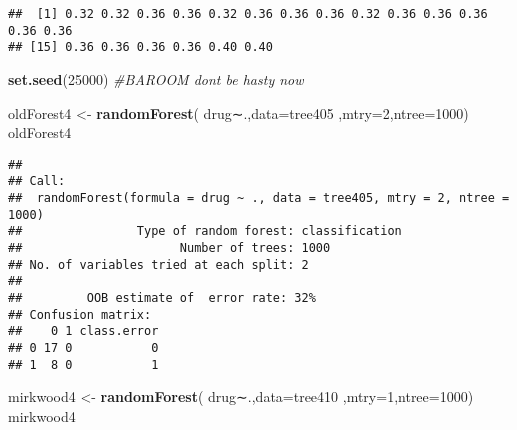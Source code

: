 \documentclass[]{article}
\newenvironment{Shaded}{\begin{snugshade}}{\end{snugshade}}
\newcommand{\KeywordTok}[1]{\textcolor[rgb]{0.13,0.29,0.53}{\textbf{#1}}}
\newcommand{\DataTypeTok}[1]{\textcolor[rgb]{0.13,0.29,0.53}{#1}}
\newcommand{\DecValTok}[1]{\textcolor[rgb]{0.00,0.00,0.81}{#1}}
\newcommand{\StringTok}[1]{\textcolor[rgb]{0.31,0.60,0.02}{#1}}
\newcommand{\CommentTok}[1]{\textcolor[rgb]{0.56,0.35,0.01}{\textit{#1}}}
\newcommand{\ControlFlowTok}[1]{\textcolor[rgb]{0.13,0.29,0.53}{\textbf{#1}}}
\newcommand{\OperatorTok}[1]{\textcolor[rgb]{0.81,0.36,0.00}{\textbf{#1}}}
\newcommand{\NormalTok}[1]{#1}
\begin{document}
\begin{Shaded}
\end{Shaded}

\begin{verbatim}
##  [1] 0.32 0.32 0.36 0.36 0.32 0.36 0.36 0.36 0.32 0.36 0.36 0.36 0.36 0.36
## [15] 0.36 0.36 0.36 0.36 0.40 0.40
\end{verbatim}

\begin{Shaded}
\begin{Highlighting}[]
\KeywordTok{set.seed}\NormalTok{(}\DecValTok{25000}\NormalTok{)}
\CommentTok{#BAROOM dont be hasty now}

\NormalTok{oldForest4 <-}\StringTok{ }\KeywordTok{randomForest}\NormalTok{( drug∼.,}\DataTypeTok{data=}\NormalTok{tree405  ,}\DataTypeTok{mtry=}\DecValTok{2}\NormalTok{,}\DataTypeTok{ntree=}\DecValTok{1000}\NormalTok{)}
\NormalTok{oldForest4}
\end{Highlighting}
\end{Shaded}

\begin{verbatim}
## 
## Call:
##  randomForest(formula = drug ~ ., data = tree405, mtry = 2, ntree = 1000) 
##                Type of random forest: classification
##                      Number of trees: 1000
## No. of variables tried at each split: 2
## 
##         OOB estimate of  error rate: 32%
## Confusion matrix:
##    0 1 class.error
## 0 17 0           0
## 1  8 0           1
\end{verbatim}

\begin{Shaded}
\begin{Highlighting}[]
\NormalTok{mirkwood4 <-}\StringTok{ }\KeywordTok{randomForest}\NormalTok{( drug∼.,}\DataTypeTok{data=}\NormalTok{tree410  ,}\DataTypeTok{mtry=}\DecValTok{1}\NormalTok{,}\DataTypeTok{ntree=}\DecValTok{1000}\NormalTok{)}
\NormalTok{mirkwood4}
\end{Highlighting}
\end{Shaded}
\end{document}
